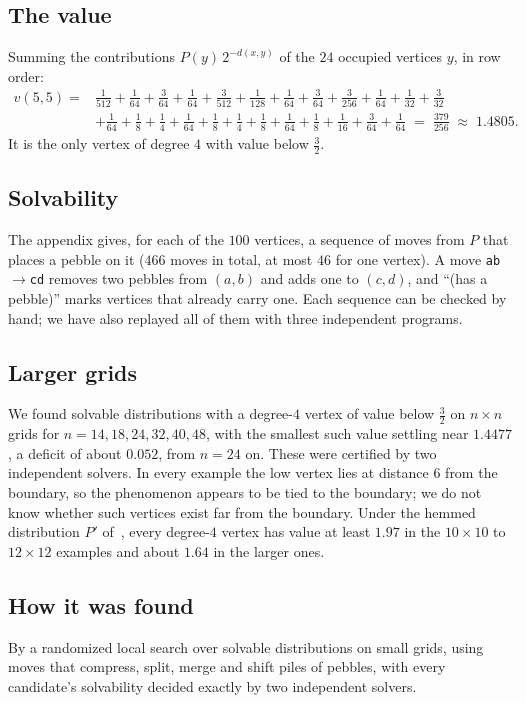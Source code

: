 \documentclass[11pt]{amsart}
\begin{document}
\subsection*{The value}
Summing the contributions $P(y)\,2^{-d(x,y)}$ of the $24$ occupied vertices
$y$, in row order:
\begin{align*}
v(5,5) = {}&
\tfrac{1}{512} + \tfrac{1}{64} + \tfrac{3}{64} + \tfrac{1}{64}
+ \tfrac{3}{512} + \tfrac{1}{128} + \tfrac{1}{64} + \tfrac{3}{64}
+ \tfrac{3}{256} + \tfrac{1}{64} + \tfrac{1}{32} + \tfrac{3}{32}\\
&+ \tfrac{1}{64} + \tfrac18 + \tfrac14 + \tfrac{1}{64} + \tfrac18
+ \tfrac14 + \tfrac18 + \tfrac{1}{64} + \tfrac18 + \tfrac{1}{16}
+ \tfrac{3}{64} + \tfrac{1}{64}
\;=\; \frac{379}{256} \;\approx\; 1.4805 .
\end{align*}
It is the only vertex of degree $4$ with value below $\frac32$.

\subsection*{Solvability}
The appendix gives, for each of the $100$ vertices, a sequence of moves from $P$
that places a pebble on it ($466$ moves in total, at most $46$ for one vertex).
A move \texttt{ab}$\to$\texttt{cd} removes two pebbles from $(a,b)$ and adds one
to $(c,d)$, and ``(has a pebble)'' marks vertices that already carry one. Each sequence
can be checked by hand; we have also replayed all of them with three independent
programs.

\subsection*{Larger grids}
We found solvable distributions with a degree-$4$ vertex of value below
$\frac32$ on $n \times n$ grids for $n = 14, 18, 24, 32, 40, 48$, with the
smallest such value settling near $1.4477$, a deficit of about $0.052$, from
$n = 24$ on. These were certified by two independent solvers. In every example
the low vertex lies at distance $6$ from the boundary, so the phenomenon appears
to be tied to the boundary; we do not know whether such vertices exist far from
the boundary. Under the hemmed distribution $P'$ of~\cite{PPS}, every degree-$4$
vertex has value at least $1.97$ in the $10\times10$ to $12\times12$ examples
and about $1.64$ in the larger ones.

\subsection*{How it was found}
By a randomized local search over solvable distributions on small grids, using
moves that compress, split, merge and shift piles of pebbles, with every
candidate's solvability decided exactly by two independent solvers.
\end{document}
